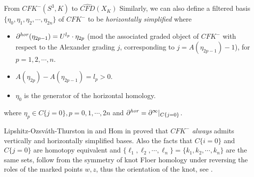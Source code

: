 \documentclass[11pt,reqno]{amsart}
\theoremstyle{definition}
\newtheorem *{remark}{Remark}
\newcommand{\cfkminus}{\mathit{CFK}^{-}}
\begin{document}
\begin{subsection}{From $CFK^{-}(S^3,K)$ to $\widehat{CFD}(X_K)$}
Similarly, we can also define a filtered basis  $\{\eta_0, \eta_1,\eta_2, \cdots, \eta_{2n} \}$ of $\cfkminus$ to be  \emph{horizontally simplified} where
\begin{itemize}
    \item $\partial^{\it{hor}} (\eta_{2p-1}) = U^{l_p} \cdot \eta_{2p}$ (mod the associated graded object of $CFK^{-}$ with respect to the Alexander grading $j$, corresponding to $j = A(\eta_{2p-1}) - 1$), for $p = 1,2,\cdots,n.$
    \item $A(\eta_{2p}) - A(\eta_{2p-1}) = l_p > 0.$ 
    \item $\eta_0$ is the generator of the horizontal homology.
\end{itemize}
where $\eta_p \in C\{j=0\} ,p = 0,1,\cdots,2n$ and $\partial^{\it{hor}} = \partial^{\infty}|_{C\{j=0\}}$.

Lipshitz-Ozsv\'ath-Thurston in \cite[Theorem 11.57] {lot08} and Hom in \cite[Lemma 2.1]{hom11} proved that $\cfkminus$ \textit{always} admits vertically and horizontally simplified bases. Also the facts that $C\{i=0\}$ and $C\{j=0\}$ are homotopy equivalent and $\{\ell_1,\ell_2,\cdots,\ell_n\} = \{k_1,k_2,\cdots,k_n\}$ are the same sets, follow from the symmetry of knot Floer homology under reversing the roles of the marked points $w,z$, thus the orientation of the knot, see \cite[Proposition 3.8]{osknot04}.


\end{subsection}
\end{document}
